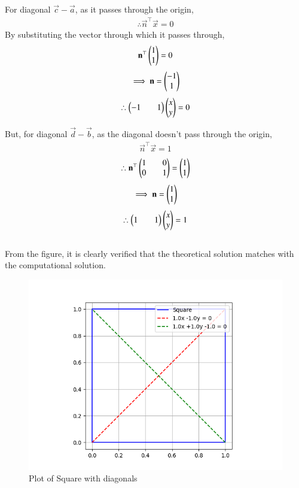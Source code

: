 \documentclass[journal]{IEEEtran}
\begin{document}
For diagonal $\vec{c}-\vec{a}$, as it passes through the origin,
\begin{align*}
    \therefore \vec{n}^{\top}\vec{x}=0
\end{align*}
By substituting the vector through which it passes through,
\begin{align*}
    \mathbf{n}^{\top}\begin{pmatrix}1\\1\end{pmatrix}=0
\end{align*}
\begin{align*}
    \implies \mathbf{n}=\begin{pmatrix}-1\\1\end{pmatrix}
\end{align*}
\begin{align*}
    \therefore \begin{pmatrix}-1&&1\end{pmatrix}\begin{pmatrix}x\\y\end{pmatrix}=0
\end{align*}
\newpage
\vspace*{0.25cm}

But, for diagonal $\vec{d}-\vec{b}$, as the diagonal doesn't pass through the origin,
\begin{align*}
    \vec{n}^{\top}\vec{x}=1
\end{align*}
\begin{align*}
    \therefore \mathbf{n}^{\top}\begin{pmatrix}1&&0\\0&&1\end{pmatrix}=\begin{pmatrix}1\\1\end{pmatrix}
\end{align*}
\begin{align*}
    \implies \mathbf{n}=\begin{pmatrix}1\\1\end{pmatrix}
\end{align*}
\begin{align*}
    \therefore \begin{pmatrix}1&&1\end{pmatrix}\begin{pmatrix}x\\y\end{pmatrix}=1
\end{align*}
\\
From the figure, it is clearly verified that the theoretical solution matches with the computational solution.\\
\begin{figure}[H]
    \centering
    \includegraphics[width=0.6\columnwidth]{figs/Figure_1.png}
    \caption*{Plot of Square with diagonals}
    \label{fig:1}
\end{figure}
\end{document}
